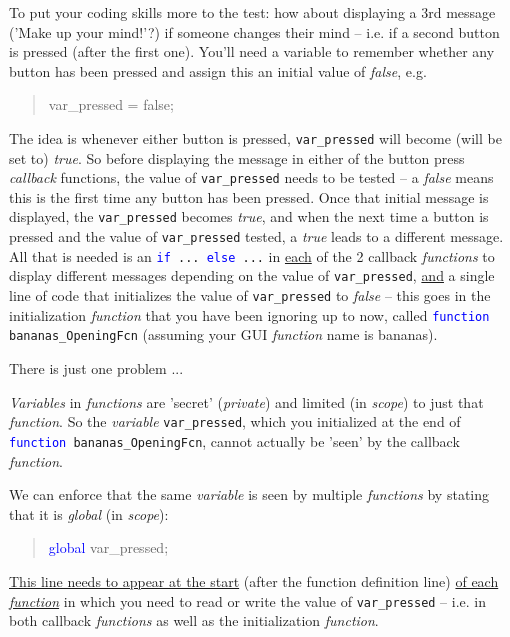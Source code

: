 \documentclass{tufte-book} %
\newenvironment{docspec}{\begin{quotation}\ttfamily\parskip0pt\parindent0pt\ignorespaces}{\end{quotation}}
\begin{document}
\noindent To put your coding skills more to the test: how about displaying a 3rd message ('Make up your mind!'?) if someone changes their mind -- i.e. if a second button is pressed (after the first one). You'll need a variable to remember whether any button has been pressed and assign this an initial value of \textit{false}, e.g.
\begin{docspec}
var\_pressed = false;
\end{docspec}
The idea is whenever either button is pressed, \texttt{var\_pressed} will become (will be set to) \textit{true}. So before displaying the message in either of the button press \textit{callback} functions, the value of \texttt{var\_pressed} needs to be tested -- a \textit{false} means this is the first time any button has been pressed. Once that initial message is displayed, the \texttt{var\_pressed} becomes \textit{true}, and when the next time a button is pressed and the value of \texttt{var\_pressed} tested, a \textit{true} leads to a different message. All that is needed is an \texttt{\textcolor{blue}{if} ... \textcolor{blue}{else} ...} in \uline{each} of the 2 callback \textit{functions} to display different messages depending on the value of \texttt{var\_pressed}, \uline{and} a single line of code that initializes the value of \texttt{var\_pressed} to \textit{false} -- this goes in the initialization \textit{function} that you have been ignoring up to now, called \texttt{\textcolor{blue}{function} bananas\_OpeningFcn} (assuming your GUI \textit{function} name is \textsf{bananas}). 

There is just one problem ...

\textit{Variables} in \textit{functions} are 'secret' (\textit{private}) and limited (in \textit{scope}) to just that \textit{function}. So the \textit{variable} \texttt{var\_pressed}, which you initialized at the end of \texttt{\textcolor{blue}{function} bananas\_OpeningFcn}, cannot actually be 'seen' by the callback \textit{function}.

We can enforce that the same \textit{variable} is seen by multiple \textit{functions} by stating that it is \textit{global} (in \textit{scope}):
\vspace{-1mm}\begin{docspec}
\textcolor{blue}{global} var\_pressed;
\end{docspec}\vspace{-1mm}
\uline{This line needs to appear at the start} (after the function definition line) \uline{of each \textit{function}} in which you need to read or write the value of \texttt{var\_pressed} -- i.e. in both callback \textit{functions} as well as the initialization \textit{function}.
\end{document}
